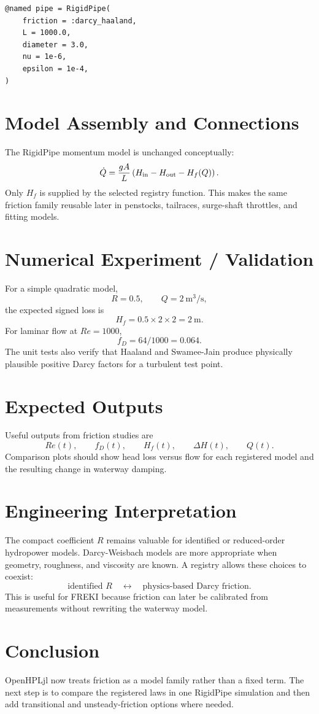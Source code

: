 \documentclass[11pt,a4paper]{article}
\begin{document}
\begin{lstlisting}
@named pipe = RigidPipe(
    friction = :darcy_haaland,
    L = 1000.0,
    diameter = 3.0,
    nu = 1e-6,
    epsilon = 1e-4,
)
\end{lstlisting}

\section{Model Assembly and Connections}
The RigidPipe momentum model is unchanged conceptually:
\[
\dot Q=\frac{gA}{L}
\left(H_{\rm in}-H_{\rm out}-H_f(Q)\right).
\]
Only $H_f$ is supplied by the selected registry function. This makes the same friction family reusable later in penstocks, tailraces, surge-shaft throttles, and fitting models.

\section{Numerical Experiment / Validation}
For a simple quadratic model,
\[
R=0.5,\qquad Q=2~\si{\meter\cubed\per\second},
\]
the expected signed loss is
\[
\boxed{H_f=0.5\times2\times2=2~\si{\meter}}.
\]
For laminar flow at $Re=1000$,
\[
\boxed{f_D=64/1000=0.064}.
\]
The unit tests also verify that Haaland and Swamee-Jain produce physically plausible positive Darcy factors for a turbulent test point.

\section{Expected Outputs}
Useful outputs from friction studies are
\[
Re(t),\qquad f_D(t),\qquad H_f(t),\qquad \Delta H(t),\qquad Q(t).
\]
Comparison plots should show head loss versus flow for each registered model and the resulting change in waterway damping.

\section{Engineering Interpretation}
The compact coefficient $R$ remains valuable for identified or reduced-order hydropower models. Darcy-Weisbach models are more appropriate when geometry, roughness, and viscosity are known. A registry allows these choices to coexist:
\[
\boxed{\text{identified }R\quad\leftrightarrow\quad\text{physics-based Darcy friction}}.
\]
This is useful for FREKI because friction can later be calibrated from measurements without rewriting the waterway model.

\section*{Conclusion}
OpenHPLjl now treats friction as a model family rather than a fixed term. The next step is to compare the registered laws in one RigidPipe simulation and then add transitional and unsteady-friction options where needed.
\end{document}
